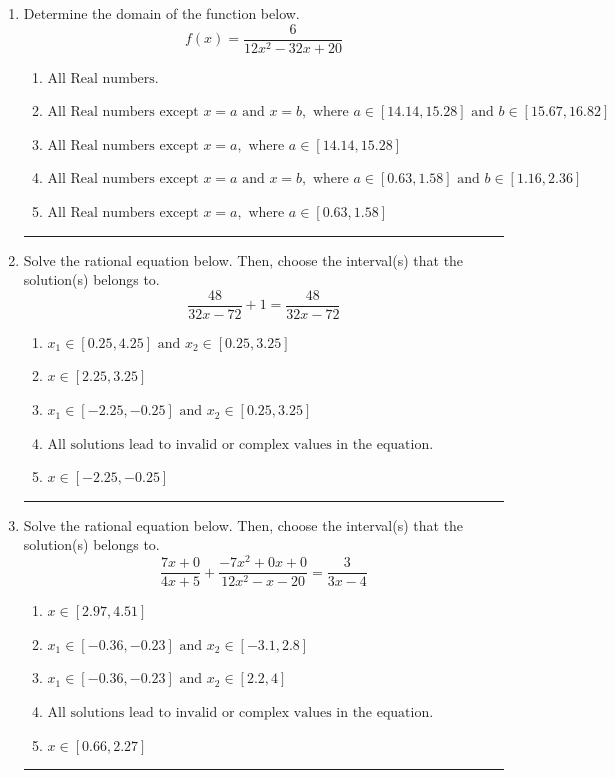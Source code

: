 \documentclass[14pt]{extbook}
\newcommand{\litem}[1]{\item#1\hspace*{-1cm}\rule{\textwidth}{0.4pt}}
\begin{document}
\begin{enumerate}
\litem{
Determine the domain of the function below.\[ f(x) = \frac{6}{12x^{2} -32 x + 20} \]\begin{enumerate}[label=\Alph*.]
\item \( \text{All Real numbers.} \)
\item \( \text{All Real numbers except } x = a \text{ and } x = b, \text{ where } a \in [14.14, 15.28] \text{ and } b \in [15.67, 16.82] \)
\item \( \text{All Real numbers except } x = a, \text{ where } a \in [14.14, 15.28] \)
\item \( \text{All Real numbers except } x = a \text{ and } x = b, \text{ where } a \in [0.63, 1.58] \text{ and } b \in [1.16, 2.36] \)
\item \( \text{All Real numbers except } x = a, \text{ where } a \in [0.63, 1.58] \)

\end{enumerate} }
\litem{
Solve the rational equation below. Then, choose the interval(s) that the solution(s) belongs to.\[ \frac{48}{32x -72} + 1 = \frac{48}{32x -72} \]\begin{enumerate}[label=\Alph*.]
\item \( x_1 \in [0.25, 4.25] \text{ and } x_2 \in [0.25,3.25] \)
\item \( x \in [2.25,3.25] \)
\item \( x_1 \in [-2.25, -0.25] \text{ and } x_2 \in [0.25,3.25] \)
\item \( \text{All solutions lead to invalid or complex values in the equation.} \)
\item \( x \in [-2.25,-0.25] \)

\end{enumerate} }
\litem{
Solve the rational equation below. Then, choose the interval(s) that the solution(s) belongs to.\[ \frac{7x + 0}{4x + 5} + \frac{-7x^{2} +0 x + 0}{12x^{2} -x -20} = \frac{3}{3x -4} \]\begin{enumerate}[label=\Alph*.]
\item \( x \in [2.97,4.51] \)
\item \( x_1 \in [-0.36, -0.23] \text{ and } x_2 \in [-3.1,2.8] \)
\item \( x_1 \in [-0.36, -0.23] \text{ and } x_2 \in [2.2,4] \)
\item \( \text{All solutions lead to invalid or complex values in the equation.} \)
\item \( x \in [0.66,2.27] \)


\end{enumerate}}
\end{enumerate}
\end{document}
